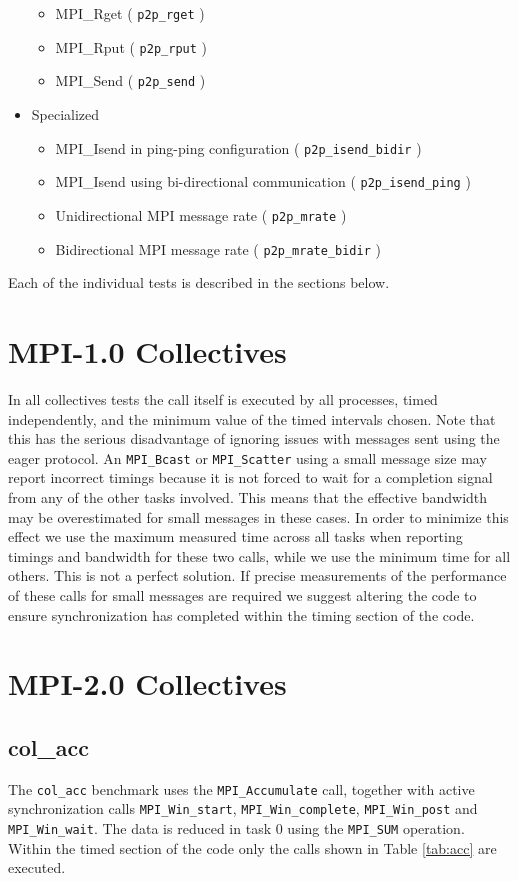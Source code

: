 \documentclass[10pt,a4paper]{report}
\begin{document}
\begin{itemize}
\begin{itemize}
	\item{MPI\_Rget ( \texttt{p2p\_rget} )}
	\item{MPI\_Rput ( \texttt{p2p\_rput} )}
	\item{MPI\_Send ( \texttt{p2p\_send} )}
\end{itemize}
\item{Specialized}
\begin{itemize}
	\item{MPI\_Isend in ping-ping configuration ( \texttt{p2p\_isend\_bidir} )}
	\item{MPI\_Isend using bi-directional communication ( \texttt{p2p\_isend\_ping} )}
	\item{Unidirectional MPI message rate ( \texttt{p2p\_mrate} )}
	\item{Bidirectional MPI message rate ( \texttt{p2p\_mrate\_bidir} )}
\end{itemize}
\end{itemize}

Each of the individual tests is described in the sections below.

\section{MPI-1.0 Collectives}
\label{sec:collectives}

In all collectives tests the call itself is executed by all processes, timed independently, and the minimum value of the timed intervals chosen. Note that this has the serious disadvantage of ignoring issues with messages sent using the eager protocol. An \verb+MPI_Bcast+ or \verb+MPI_Scatter+ using a small message size may report incorrect timings because it is not forced to wait for a completion signal from any of the other tasks involved. This means that the effective bandwidth may be overestimated for small messages in these cases. In order to minimize this effect we use the maximum measured time across all tasks when reporting timings and bandwidth for these two calls, while we use the minimum time for all others. This is not a perfect solution. If precise measurements of the performance of these calls for small messages are required we suggest altering the code to ensure synchronization has completed within the timing section of the code. 

\section{MPI-2.0 Collectives}
\subsection{col\_acc}
The \verb+col_acc+ benchmark uses the \verb+MPI_Accumulate+ call, together with active synchronization calls \verb+MPI_Win_start+, \verb+MPI_Win_complete+, \verb+MPI_Win_post+ and \verb+MPI_Win_wait+. The data is reduced in task 0 using the \verb+MPI_SUM+ operation. Within the timed section of the code only the calls shown in Table \ref{tab:acc} are executed.
\end{document}
